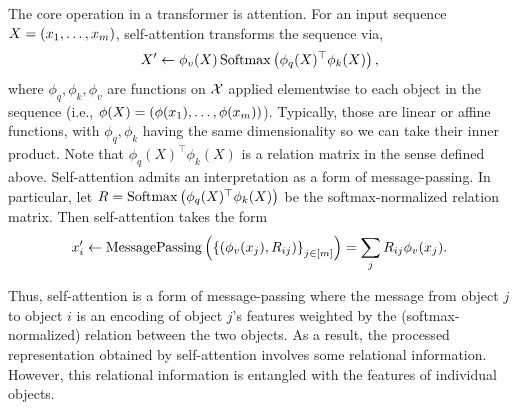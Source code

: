 The core operation in a transformer is attention. For an input sequence $X = \left(x_1, \ldots, x_m\right)$, self-attention transforms the sequence via,
\begin{equation}\label{eq:self_attn}
    X' \gets \phi_v(X) \, \mathrm{Softmax}\left(\phi_q(X)^\top \phi_k(X)\right),
\end{equation}
where $\phi_q, \phi_k, \phi_v$ are functions on ${\mathcal{X}}$ applied elementwise to each object in the sequence (i.e., $\phi(X) = \left(\phi(x_1), \ldots, \phi(x_m)\right)$). Typically, those are linear or affine functions, with $\phi_q, \phi_k$ having the same dimensionality so we can take their inner product. Note that $\phi_q(X)^\top \phi_k(X)$ is a relation matrix in the sense defined above. Self-attention admits an interpretation as a form of message-passing. In particular, let $R = \mathrm{Softmax}\left(\phi_q(X)^\top \phi_k(X)\right)$ be the softmax-normalized relation matrix. Then self-attention takes the form
\begin{equation}\label{eq:self_attn_message_passing}
    x_i' \gets \mathrm{MessagePassing}\left(\left\{(\phi_v(x_j), R_{ij})\right\}_{j \in [m]}\right) = \sum_{j} R_{ij} \phi_v(x_j).
\end{equation}

Thus, self-attention is a form of message-passing where the message from object $j$ to object $i$ is an encoding of object $j$'s features weighted by the (softmax-normalized) relation between the two objects. As a result, the processed representation obtained by self-attention involves some relational information. However, this relational information is entangled with the features of individual objects.

